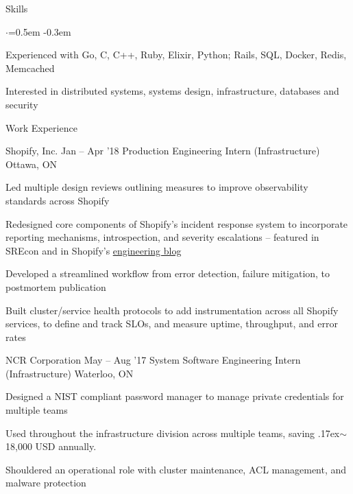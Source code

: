 \documentclass{resume} %
\begin{document}

\begin{rSection}{Skills}
  \vspace {0.3em}
  \begin{list}{$\cdot$}{\leftmargin=0.5em}
    \itemsep -0.3em \vspace{-0.3em}
    \item Experienced with Go, C, C++, Ruby, Elixir, Python; Rails, SQL, Docker, Redis,
      Memcached
    \item Interested in distributed systems, systems design, infrastructure,
      databases and security 
  \end{list}
  \vspace{0.3em}
\end{rSection}



\begin{rSection}{Work Experience}
  \begin{rSubsection}{Shopify, Inc.}
		     {Jan -- Apr '18}
		     {Production Engineering Intern (Infrastructure)}
		     {Ottawa, ON}
    \item Led multiple design reviews outlining measures to improve
      observability standards across Shopify
    \item Redesigned core components of Shopify's incident response system
      to incorporate reporting mechanisms, introspection, and severity
      escalations -- featured in SREcon and in Shopify's
      \href{https://engineering.shopify.com/blogs/engineering/implementing-chatops-into-our-incident-management-procedure}
      {\underline{engineering blog}}
    \item Developed a streamlined workflow from error detection, failure
      mitigation, to postmortem publication
    \item Built cluster/service health protocols to add instrumentation across
      all Shopify services, to define and track SLOs, and measure uptime,
      throughput, and error rates
  \end{rSubsection}

  \begin{rSubsection}{NCR Corporation}
		     {May -- Aug '17}
		     {System Software Engineering Intern (Infrastructure)}
		     {Waterloo, ON}
    \item Designed a NIST compliant password manager to manage private
      credentials for multiple teams
    \item Used throughout the infrastructure division across multiple
      teams, saving {\raise.17ex\hbox{$\scriptstyle\mathtt{\sim}$}}18,000 USD
      annually. 
    \item Shouldered an operational role with cluster maintenance, ACL management,
      and malware protection
  \end{rSubsection}
\end{rSection} 
\end{document}
